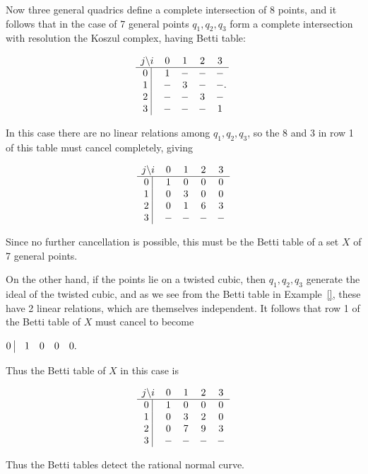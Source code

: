 \begin{example}
Now three general quadrics define a complete intersection of 8 points, and it follows that in the case of 7 general points $q_{1},q_{2},q_{3}$ form a complete intersection with resolution the Koszul complex, having Betti table:
\begin{small}
$$
\begin{matrix}
j \backslash i &0&1&2&3\\ \hline
\text{0 }\vline &1&-&-&-\\
\text{1 }\vline &-&3&-&-\\
\text{2 }\vline &-&-&3&-\\
\text{3 }\vline &-&-&-&1\\
\end{matrix}.
$$
\end{small}
In this case there are no linear relations among $q_{1},q_{2},q_{3}$, so the 8 and 3 in row 1 of this table must 
cancel completely, giving
\begin{small}
$$
\begin{matrix}
j \backslash i &0&1&2&3\\ \hline
\text{0 }\vline &1&0&0&0\\
\text{1 }\vline &0&3&0&0\\
\text{2 }\vline &0&1&6&3\\
\text{3 }\vline &-&-&-&-\\
\end{matrix}
$$
\end{small}
Since no further cancellation is possible, this must be the Betti table of a  set $X$ of 7 general points.

On the other hand, if the points lie on a twisted cubic, then $q_{1}, q_{2}, q_{3}$ generate the ideal of the twisted cubic, and as we  see from the Betti table in Example~\ref{}, these have 2 linear relations, which are themselves independent. It follows that row 1 of the Betti table of $X$ must cancel to become 
\begin{small}
 $
\begin{matrix}
\text{0 }\vline &1&0&0&0\\
\end{matrix}.
$
\end{small}
Thus the Betti table of $X$ in this case is
\begin{small}
$$
\begin{matrix}
j \backslash i &0&1&2&3\\ \hline
\text{0 }\vline &1&0&0&0\\
\text{1 }\vline &0&3&2&0\\
\text{2 }\vline &0&7&9&3\\
\text{3 }\vline &-&-&-&-\\
\end{matrix}
$$
\end{small}

\end{example}
Thus the Betti tables detect the rational normal curve.


